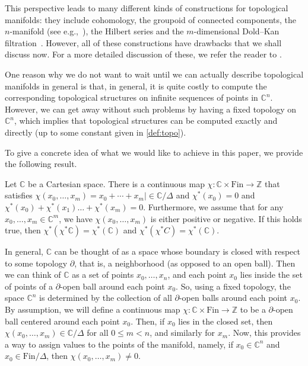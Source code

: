\documentclass[a4paper,reqno,oneside]{article}
\begin{document}
This perspective leads to many different kinds of constructions for topological manifolds: they include cohomology, the groupoid of connected components, the $n$-manifold (see e.g.,~\cite{ClementinaGeometria,KellerTopologia,LambertTopologia}), the Hilbert series and the $m$-dimensional Dold--Kan filtration~\cite{DoldKanTopos}. However, all of these constructions have drawbacks that we shall discuss now. For a more detailed discussion of these, we refer the reader to \cite{WilliamsTopologyBook,Sutter}. 

One reason why we do not want to wait until we can actually describe topological manifolds in general is that, in general, it is quite costly to compute the corresponding topological structures on infinite sequences of points in $\mathbb C^n$. However, we can get away without such problems by having a fixed topology on $\mathbb C^n$, which implies that topological structures can be computed exactly and directly (up to some constant given in \cref{def:topo}). 

To give a concrete idea of what we would like to achieve in this paper, we provide the following result.

\begin{theorem}\label{thm:topological}
Let $\mathbb C$ be a Cartesian space. There is a continuous map $\chi:\mathbb C\times \text{Fin}\to \mathbb Z$ that satisfies $\chi(x_0,\dots,x_m)=x_0+\cdots+x_m|\in\mathbb C/\Delta$ and $\chi^{*}(x_0)=0$ and $\chi^{\ast}(x_0)+\chi^{\ast}(x_1)\dots+\chi^{\ast}(x_{m})=0$. Furthermore, we assume that for any $x_0,\dots,x_m\in\mathbb C^m$, we have $\chi(x_0,\dots,x_m)$ is either positive or negative. If this holds true, then $\chi^*(\chi^*\mathbb C)=\chi^{*}(\mathbb C)$ and $\chi^{\ast}(\chi^{\ast}C)=\chi^{\ast}(\mathbb C)$. 
\end{theorem}


In general, $\mathbb C$ can be thought of as a space whose boundary is closed with respect to some topology $\partial$, that is, a neighborhood (as opposed to an open ball). Then we can think of $\mathbb C$ as a set of points $x_0,\dots,x_n$, and each point $x_0$ lies inside the set of points of a $\partial$-open ball around each point $x_0$. So, using a fixed topology, the space $\mathbb C^n$ is determined by the collection of all $\partial$-open balls around each point $x_0$. By assumption, we will define a continuous map $\chi:\mathbb C\times \text{Fin}\to\mathbb Z$ to be a $\partial$-open ball centered around each point $x_0$. Then, if $x_0$ lies in the closed set, then $\chi(x_0,\dots,x_m)\in\mathbb C/\Delta$ for all $0\leq m<n$, and similarly for $x_m$. Now, this provides a way to assign values to the points of the manifold, namely, if $x_0\in\mathbb C^n$ and $x_0\in\text{Fin}/\Delta$, then $\chi(x_0,\dots,x_m)\neq 0$. 
\end{document}
